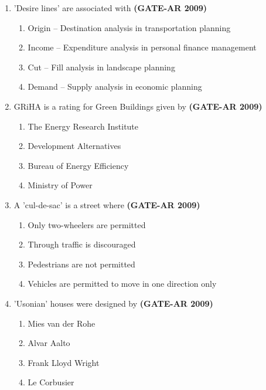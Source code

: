 \documentclass[a4paper,10pt]{article}
\begin{document}
\begin{enumerate}
    \item 'Desire lines' are associated with \hfill \textbf{(GATE-AR 2009)}
    \begin{enumerate}
        \item Origin – Destination analysis in transportation planning
        \item Income – Expenditure analysis in personal finance management
        \item Cut – Fill analysis in landscape planning
        \item Demand – Supply analysis in economic planning
    \end{enumerate}

	\item GRiHA is a rating for Green Buildings given by \hfill \textbf{(GATE-AR 2009)}
    \begin{multicols}{2}
	\begin{enumerate}
        \item The Energy Research Institute
        \item Development Alternatives
        \item Bureau of Energy Efficiency
        \item Ministry of Power
    \end{enumerate}
	\end{multicols}
    
    \item A 'cul-de-sac' is a street where \hfill \textbf{(GATE-AR 2009)}
    \begin{enumerate}
        \item Only two-wheelers are permitted
        \item Through traffic is discouraged
        \item Pedestrians are not permitted
        \item Vehicles are permitted to move in one direction only
    \end{enumerate}

    \item 'Usonian' houses were designed by \hfill \textbf{(GATE-AR 2009)}
    \begin{multicols}{2}
	\begin{enumerate}
        \item Mies van der Rohe
        \item Alvar Aalto
        \item Frank Lloyd Wright
        \item Le Corbusier
    \end{enumerate}
	\end{multicols}
    

\end{enumerate}
\end{document}
